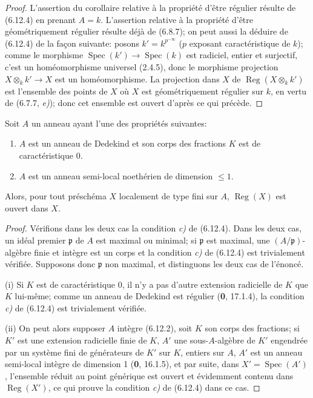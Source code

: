 \begin{proof}
L'assertion du corollaire relative à la propriété d'être régulier résulte de
(6.12.4) en prenant $A=k$. L'assertion relative à la propriété d'être
géométriquement régulier résulte déjà de (6.8.7); on peut aussi la déduire de
(6.12.4) de la façon suivante: posons $k'=k^{p^{-\infty}}$ ($p$ exposant
caractéristique de $k$); comme le morphisme
$\operatorname{Spec}(k')\to\operatorname{Spec}(k)$ est radiciel, entier et
surjectif, c'est un homéomorphisme universel (2.4.5), donc le morphisme
projection $X\otimes_kk'\to X$ est un homéomorphisme. La projection dans
$X$ de $\operatorname{Reg}(X\otimes_kk')$ est l'ensemble des points de $X$
où $X$ est géométriquement régulier sur $k$, en vertu de (6.7.7, \emph{e)}); donc
cet ensemble est ouvert d'après ce qui précède.
\end{proof}

\begin{corollary}[6.12.6]
\label{IV.2.s6.12.6-fr}
Soit $A$ un anneau ayant l'une des propriétés suivantes:
\begin{enumerate}
\item[\textup{(i)}] $A$ est un anneau de Dedekind et son corps des fractions $K$ est
de caractéristique \textup{0}.
\item[\textup{(ii)}] $A$ est un anneau semi-local noethérien de dimension $\leq1$.
\end{enumerate}
Alors, pour tout préschéma $X$ localement de type fini sur $A$,
$\operatorname{Reg}(X)$ est ouvert dans $X$.
\end{corollary}

\begin{proof}
Vérifions dans les deux cas la condition \emph{c)} de (6.12.4). Dans les deux cas,
un idéal premier $\mathfrak p$ de $A$ est maximal ou minimal; si
$\mathfrak p$ est maximal, une $(A/\mathfrak p)$-algèbre finie et intègre
est un corps et la condition \emph{c)} de (6.12.4) est trivialement vérifiée.
Supposons donc $\mathfrak p$ non maximal, et distinguons les deux cas de
l'énoncé.

(i) Si $K$ est de caractéristique 0, il n'y a pas d'autre extension
radicielle de $K$ que $K$ lui-même; comme un anneau de Dedekind est régulier
(\textbf{0}, 17.1.4), la condition \emph{c)} de (6.12.4) est trivialement vérifiée.

(ii) On peut alors supposer $A$ intègre (6.12.2), soit $K$ son corps des
fractions; si $K'$ est une extension radicielle finie de $K$, $A'$ une
sous-$A$-algèbre de $K'$ engendrée par un système fini de générateurs de
$K'$ sur $K$, entiers sur $A$, $A'$ est un anneau semi-local intègre de
dimension 1 (\textbf{0}, 16.1.5), et par suite, dans
$X'=\operatorname{Spec}(A')$, l'ensemble réduit au point générique est
ouvert et évidemment contenu dans $\operatorname{Reg}(X')$, ce qui prouve
la condition \emph{c)} de (6.12.4) dans ce cas.
\end{proof}

